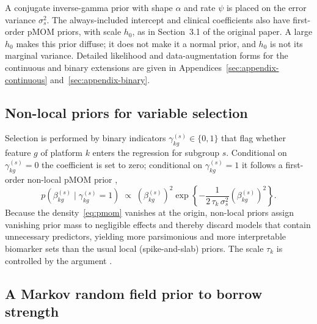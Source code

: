 \documentclass[article]{jss}
\begin{document}
%
A conjugate inverse-gamma prior with shape $\alpha$ and rate $\psi$ is placed on
the error variance $\sigma_s^2$. The always-included intercept and clinical
coefficients also have first-order pMOM priors, with scale $h_0$, as in
Section~3.1 of the original paper. A large $h_0$ makes this prior diffuse;
it does not make it a normal prior, and $h_0$ is not its marginal variance. Detailed likelihood and
data-augmentation forms for the continuous and binary extensions are given in
Appendices~\ref{sec:appendix-continuous} and~\ref{sec:appendix-binary}.

\subsection{Non-local priors for variable selection}\label{sec:nlp}

Selection is performed by binary indicators $\gamma^{(s)}_{kg}\in\{0,1\}$ that
flag whether feature $g$ of platform $k$ enters the regression for subgroup $s$.
Conditional on $\gamma^{(s)}_{kg}=0$ the coefficient is set to zero; conditional
on $\gamma^{(s)}_{kg}=1$ it follows a first-order non-local pMOM prior
\citep{johnson2012},
%
\begin{equation}\label{eq:pmom}
  p\!\left(\beta^{(s)}_{kg}\mid\gamma^{(s)}_{kg}=1\right)\;\propto\;
  \left(\beta^{(s)}_{kg}\right)^{2}
  \exp\!\left\{-\frac{1}{2\,\tau_k\,\sigma^2_s}\left(\beta^{(s)}_{kg}\right)^{2}\right\}.
\end{equation}
%
Because the density~\eqref{eq:pmom} vanishes at the origin, non-local priors
assign vanishing prior mass to negligible effects and thereby discard models
that contain unnecessary predictors, yielding more parsimonious and more
interpretable biomarker sets than the usual local (spike-and-slab) priors. The
scale $\tau_k$ is controlled by the argument .

\subsection{A Markov random field prior to borrow strength}\label{sec:mrf}
\end{document}
